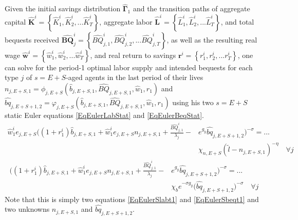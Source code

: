 \documentclass[letterpaper,12pt]{article}
\theoremstyle{definition}
\begin{document}
  Given the initial savings distribution $\bm{\hat{\Gamma}}_1$ and the transition paths of aggregate capital $\bm{\hat{K}}^i = \left\{\hat{K}_1^i,\hat{K}_2^i,...\hat{K}_T^i\right\}$, aggregate labor $\bm{\hat{L}}^i = \left\{\hat{L}_1^i,\hat{L}_2^i,...\hat{L}_T^i\right\}$, and total bequests received $\bm{\hat{BQ}}_j^i = \left\{\hat{BQ}_{j,1}^i,\hat{BQ}_{j,2}^i,...\hat{BQ}_{j,T}^i\right\}$, as well as the resulting real wage $\bm{\hat{w}}^i = \left\{\hat{w}_1^i,\hat{w}_2^i,...\hat{w}_T^i\right\}$, and real return to savings $\bm{r}^i = \left\{r_1^i,r_2^i,...r_T^i\right\}$, one can solve for the period-1 optimal labor supply and intended bequests for each type $j$ of $s=E+S$-aged agents in the last period of their lives $n_{j,E+S,1}=\phi_{j,E+S}(\hat{b}_{j,E+S,1},\hat{BQ}_{j,E+S,1},\hat{w}_1,r_1)$ and $\hat{bq}_{j,E+S+1,2}=\varphi_{j,E+S}(\hat{b}_{j,E+S,1},\hat{BQ}_{j,E+S,1},\hat{w}_1,r_1)$ using his two $s=E+S$ static Euler equations \eqref{EqEulerLabStat} and \eqref{EqEulerBeqStat}.
  \begin{equation}\label{EqEulerSlabt1}
    \begin{split}
      \hat{w}_1^i e_{j,E+S}\biggl(\left(1+r_1^i\right)\hat{b}_{j,E+S,1} + \hat{w}_1^i e_{j,E+S}n_{j,E+S,1} + \frac{\hat{BQ}_{j,1}^i}{\lambda_j} - &e^{g_y}\hat{bq}_{j,E+S+1,2}\biggr)^{-\sigma} = ... \\
      &\chi_{n,E+S}(\tilde{l} - n_{j,E+S,1})^{-\eta} \quad\forall j
    \end{split}
  \end{equation}
  \begin{equation}\label{EqEulerSbeqt1}
    \begin{split}
      \biggl(\left(1+r_1^i\right)\hat{b}_{j,E+S,1} + \hat{w}_1^i e_{j,E+S}n_{j,E+S,1} + \frac{\hat{BQ}_{j,1}^i}{\lambda_j} - &e^{g_y}\hat{bq}_{j,E+S+1,2}\biggr)^{-\sigma} = ... \\
      &\chi_b e^{-\sigma g_y}\bigl(\hat{bq}_{j,E+S+1,2}\bigr)^{-\sigma} \quad\forall j
    \end{split}
  \end{equation}
  Note that this is simply two equations \eqref{EqEulerSlabt1} and \eqref{EqEulerSbeqt1} and two unknowns $n_{j,E+S,1}$ and $\hat{bq}_{j,E+S+1,2}$.
\end{document}
